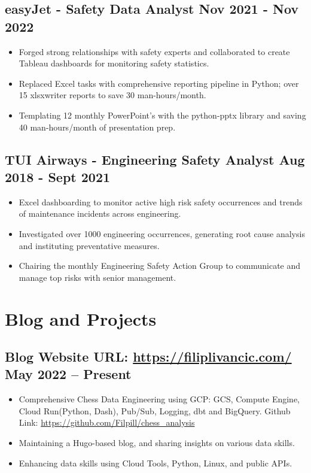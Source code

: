 \documentclass[a4paper, 9pt]{article}
\begin{document}
\subsection*{\textbf{easyJet - Safety Data Analyst} \hfill  Nov 2021 - Nov 2022}
\begin{itemize}[noitemsep]
    \item Forged strong relationships with safety experts and collaborated to create Tableau dashboards for monitoring safety statistics.
    \item Replaced Excel tasks with comprehensive reporting pipeline in Python; over 15 xlsxwriter reports to save 30 man-hours/month.
    \item Templating 12 monthly PowerPoint's with the python-pptx library and saving 40 man-hours/month of presentation prep.
\end{itemize}

\subsection*{\textbf{TUI Airways - Engineering Safety Analyst} \hfill  Aug 2018 - Sept 2021}
\begin{itemize}[noitemsep]
    \item Excel dashboarding to monitor active high risk safety occurrences and trends of maintenance incidents across engineering.
    \item Investigated over 1000 engineering occurrences, generating root cause analysis and instituting preventative measures.
    \item Chairing the monthly Engineering Safety Action Group to communicate and manage top risks with senior management.
\end{itemize}

\section*{Blog and Projects}
\vspace{-2.5mm}

\subsection*{\textbf{Blog Website URL}: \url{https://filiplivancic.com/} \hfill  May 2022 – Present}
\begin{itemize}[noitemsep]
  \item Comprehensive Chess Data Engineering using GCP: GCS, Compute Engine, Cloud Run(Python, Dash), Pub/Sub, Logging, dbt and BigQuery. 
      \subitem Github Link: \url{https://github.com/Filpill/chess_analysis} 
\vspace{1.5mm}
    \item Maintaining a Hugo-based blog, and sharing insights on various data skills.
    \item Enhancing data skills using Cloud Tools, Python, Linux, and public APIs.
\end{itemize}
\end{document}
